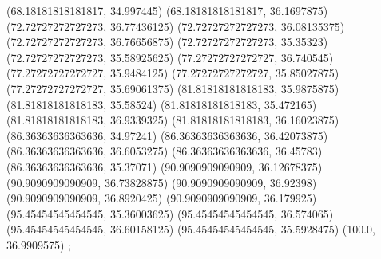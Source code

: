 {{{		(68.18181818181817, 34.997445)
		(68.18181818181817, 36.1697875)
		(72.72727272727273, 36.77436125)
		(72.72727272727273, 36.08135375)
		(72.72727272727273, 36.76656875)
		(72.72727272727273, 35.35323)
		(72.72727272727273, 35.58925625)
		(77.27272727272727, 36.740545)
		(77.27272727272727, 35.9484125)
		(77.27272727272727, 35.85027875)
		(77.27272727272727, 35.69061375)
		(81.81818181818183, 35.9875875)
		(81.81818181818183, 35.58524)
		(81.81818181818183, 35.472165)
		(81.81818181818183, 36.9339325)
		(81.81818181818183, 36.16023875)
		(86.36363636363636, 34.97241)
		(86.36363636363636, 36.42073875)
		(86.36363636363636, 36.6053275)
		(86.36363636363636, 36.45783)
		(86.36363636363636, 35.37071)
		(90.9090909090909, 36.12678375)
		(90.9090909090909, 36.73828875)
		(90.9090909090909, 36.92398)
		(90.9090909090909, 36.8920425)
		(90.9090909090909, 36.179925)
		(95.45454545454545, 35.36003625)
		(95.45454545454545, 36.574065)
		(95.45454545454545, 36.60158125)
		(95.45454545454545, 35.5928475)
		(100.0, 36.9909575)
	};

}}

